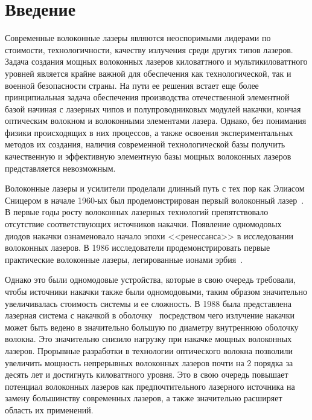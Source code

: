\chapter*{Введение}							%

Современные волоконные лазеры являются неоспоримыми лидерами по стоимости, технологичности, качеству излучения среди других типов лазеров. Задача создания мощных волоконных лазеров киловаттного и мультикиловаттного уровней является крайне важной для обеспечения как технологической, так и военной безопасности страны. На пути ее решения встает еще более принципиальная задача обеспечения производства отечественной элементной базой начиная с лазерных чипов и полупроводниковых модулей накачки, кончая оптическим волокном и волоконными элементами лазера. Однако, без понимания физики происходящих в них процессов, а также освоения экспериментальных методов их создания, наличия современной технологической базы получить качественную и эффективную элементную базы мощных волоконных лазеров представляется невозможным.

Волоконные лазеры и усилители проделали длинный путь с тех пор как Элиасом Сницером в начале 1960-ых был продемонстрирован первый волоконный лазер~\cite{into_las_1}. В первые годы росту волоконных лазерных технологий препятствовало отсутствие соответствующих источников накачки. Появление одномодовых диодов накачки ознаменовало начало эпохи <<ренессанса>> в исследовании волоконных лазеров. В 1986 исследователи продемонстрировать первые практические волоконные лазеры, легированные ионами эрбия~\cite{into_las_2}.

Однако это были одномодовые устройства, которые в свою очередь требовали, чтобы источники накачки также были одномодовыми, таким образом значительно увеличивалась стоимость системы и ее сложность. В 1988 была представлена лазерная система с накачкой в оболочку~\cite{into_las_3} посредством чего излучение накачки может быть ведено в значительно большую по диаметру внутреннюю оболочку волокна. Это значительно снизило нагрузку при накачке мощных волоконных лазеров.  Прорывные разработки в технологии оптического волокна позволили увеличить мощность непрерывных волоконных лазеров почти на 2 порядка за десять лет и достигнуть киловаттного уровня. Это в свою очередь повышает потенциал волоконных лазеров как предпочтительного лазерного  источника на замену большинству современных лазеров, а также значительно расширяет область их применений.

